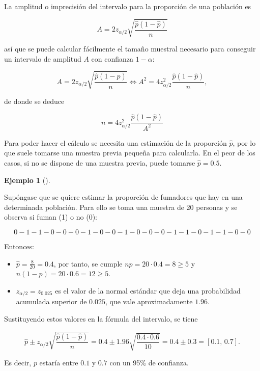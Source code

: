 \documentclass[
  a4paper,
]{scrreport}
\providecommand{\tightlist}{%
  \setlength{\itemsep}{0pt}\setlength{\parskip}{0pt}}\usepackage{longtable,booktabs,array}
\theoremstyle{plain}
\theoremstyle{definition}
\theoremstyle{definition}
\newtheorem{example}{Ejemplo}[chapter]
\theoremstyle{remark}
\begin{document}
La amplitud o imprecisión del intervalo para la proporción de una
población es

\[
A= 2 z_{\alpha/2}\sqrt{\frac{\hat{p}(1-\hat{p})}{n}}
\]

así que se puede calcular fácilmente el tamaño muestral necesario para
conseguir un intervalo de amplitud \(A\) con confianza \(1-\alpha\):

\[
A= 2 z_{\alpha/2}\sqrt{\frac{\hat{p}(1-\hat{p})}{n}} \Leftrightarrow A^2= 4 z_{\alpha/2}^2\frac{\hat{p}(1-\hat{p})}{n},
\]

de donde se deduce

\[
{n= 4 z_{\alpha/2}^2\frac{\hat{p}(1-\hat{p})}{A^2}}
\]

Para poder hacer el cálculo se necesita una estimación de la proporción
\(\hat{p}\), por lo que suele tomarse una muestra previa pequeña para
calcularla. En el peor de los casos, si no se dispone de una muestra
previa, puede tomarse \(\hat{p}=0.5\).

\begin{example}[]\protect\hypertarget{exm-intervalo-confianza-proporcion}{}\label{exm-intervalo-confianza-proporcion}

Supóngase que se quiere estimar la proporción de fumadores que hay en
una determinada población. Para ello se toma una muestra de 20 personas
y se observa si fuman (1) o no (0):

\[
0 - 1 - 1 - 0 - 0 - 0 - 1 - 0 - 0 - 1 - 0 - 0 - 0 - 1 - 1- 0 - 1 - 1 - 0 - 0
\]

Entonces:

\begin{itemize}
\tightlist
\item
  \(\hat p=\frac{8}{20}=0.4\), por tanto, se cumple
  \(np=20\cdot 0.4 = 8\geq 5\) y \(n(1-p)=20\cdot 0.6= 12\geq 5\).
\item
  \(z_{\alpha/2}=z_{0.025}\) es el valor de la normal estándar que deja
  una probabilidad acumulada superior de \(0.025\), que vale
  aproximadamente \(1.96\).
\end{itemize}

Sustituyendo estos valores en la fórmula del intervalo, se tiene

\[
\hat{p}\pm z_{\alpha/2}\sqrt{\frac{\hat{p}(1-\hat{p})}{n}} = 0.4\pm 1.96\sqrt{\frac{0.4\cdot 0.6}{10}} = 0.4\pm  0.3 = \left[0.1,\,0.7\right].
\]

Es decir, \(p\) estaría entre \(0.1\) y \(0.7\) con un 95\% de
confianza.

\end{example}
\end{document}
